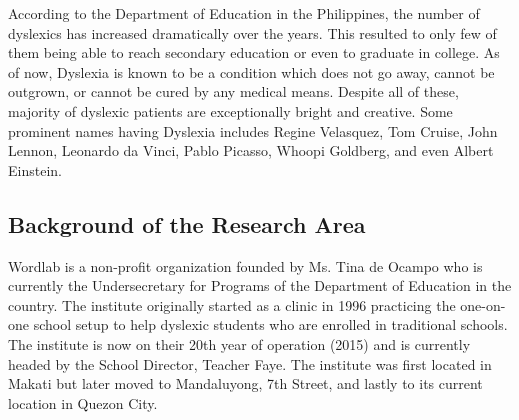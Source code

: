 \documentclass[letterpaper, 12pt, oneside]{book}
\begin{document}
According to the Department of Education in the Philippines, the number of dyslexics has increased dramatically over the years. This resulted to only few of them being able to reach secondary education or even to graduate in college. As of now, Dyslexia is known to be a condition which does not go away, cannot be outgrown, or cannot be cured by any medical means. Despite all of these, majority of dyslexic patients are exceptionally bright and creative. Some prominent names having Dyslexia includes Regine Velasquez, Tom Cruise, John Lennon, Leonardo da Vinci, Pablo Picasso, Whoopi Goldberg, and even Albert Einstein.\newline
    
\subsection{Background of the Research Area}
	Wordlab is a non-profit organization founded by Ms. Tina de Ocampo who is currently the Undersecretary for Programs of the Department of Education in the country. The institute originally started as a clinic in 1996 practicing the one-on-one school setup to help dyslexic students who are enrolled in traditional schools. The institute is now on their 20th year of operation (2015) and is currently headed by the School Director, Teacher Faye. The institute was first located in Makati but later moved to Mandaluyong, 7th Street, and lastly to its current location in Quezon City.\newline
\end{document}

